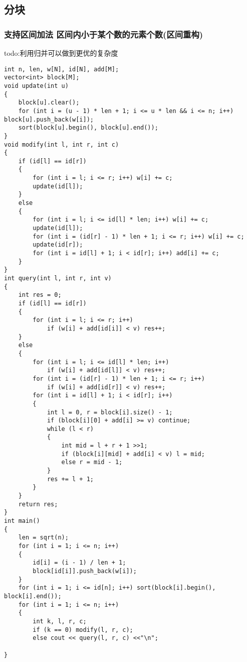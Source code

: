\documentclass[a4paper, fontset=none]{ctexart}
\begin{document}
\subsection{分块}
\subsubsection{支持区间加法 区间内小于某个数的元素个数(区间重构)}
todo:利用归并可以做到更优的复杂度
\begin{verbatim}
int n, len, w[N], id[N], add[M];
vector<int> block[M];
void update(int u)
{
    block[u].clear();
    for (int i = (u - 1) * len + 1; i <= u * len && i <= n; i++) block[u].push_back(w[i]);
    sort(block[u].begin(), block[u].end());
}
void modify(int l, int r, int c)
{
    if (id[l] == id[r])
    {
        for (int i = l; i <= r; i++) w[i] += c;
        update(id[l]);
    }
    else
    {
        for (int i = l; i <= id[l] * len; i++) w[i] += c;
        update(id[l]);
        for (int i = (id[r] - 1) * len + 1; i <= r; i++) w[i] += c;
        update(id[r]);
        for (int i = id[l] + 1; i < id[r]; i++) add[i] += c;
    }
}
int query(int l, int r, int v)
{
    int res = 0;
    if (id[l] == id[r])
    {
        for (int i = l; i <= r; i++)
            if (w[i] + add[id[i]] < v) res++;
    }
    else
    {
        for (int i = l; i <= id[l] * len; i++)
            if (w[i] + add[id[l]] < v) res++;
        for (int i = (id[r] - 1) * len + 1; i <= r; i++)
            if (w[i] + add[id[r]] < v) res++;
        for (int i = id[l] + 1; i < id[r]; i++)
        {
            int l = 0, r = block[i].size() - 1;
            if (block[i][0] + add[i] >= v) continue;
            while (l < r)
            {
                int mid = l + r + 1 >>1;
                if (block[i][mid] + add[i] < v) l = mid;
                else r = mid - 1;
            }
            res += l + 1;
        }
    }
    return res;
}
int main()
{
    len = sqrt(n);
    for (int i = 1; i <= n; i++)
    {
        id[i] = (i - 1) / len + 1;
        block[id[i]].push_back(w[i]);
    }
    for (int i = 1; i <= id[n]; i++) sort(block[i].begin(), block[i].end());
    for (int i = 1; i <= n; i++)
    {
        int k, l, r, c;
        if (k == 0) modify(l, r, c);
        else cout << query(l, r, c) <<"\n";

}
\end{verbatim}
\end{document}
